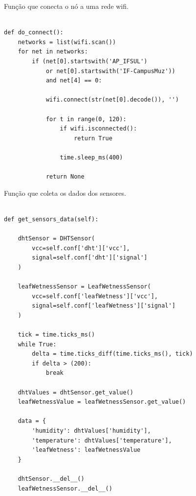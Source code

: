 \begin{quadro}[H]
\centering
\caption{Função que conecta o nó a uma rede wifi.}
\vspace{-\baselineskip}
\begin{verbatim}

def do_connect():
    networks = list(wifi.scan())
    for net in networks:
        if (net[0].startswith('AP_IFSUL') 
            or net[0].startswith('IF-CampusMuz')) 
            and net[4] == 0:
            
            wifi.connect(str(net[0].decode()), '')

            for t in range(0, 120):
                if wifi.isconnected():
                    return True

                time.sleep_ms(400)

            return None

\end{verbatim}
\vspace{-1.2cm}
\label{tab:funcao-conecta}
\end{quadro}

\begin{quadro}[H]
\centering
\caption{Função que coleta os dados dos sensores.}
\vspace{-\baselineskip}
\begin{verbatim}

def get_sensors_data(self):

    dhtSensor = DHTSensor(
        vcc=self.conf['dht']['vcc'], 
        signal=self.conf['dht']['signal']
    )
    
    leafWetnessSensor = LeafWetnessSensor(
        vcc=self.conf['leafWetness']['vcc'],
        signal=self.conf['leafWetness']['signal']
    )
        
    tick = time.ticks_ms()
    while True:
        delta = time.ticks_diff(time.ticks_ms(), tick)
        if delta > (200):
            break

    dhtValues = dhtSensor.get_value()
    leafWetnessValue = leafWetnessSensor.get_value()

    data = {
        'humidity': dhtValues['humidity'],
        'temperature': dhtValues['temperature'],
        'leafWetness': leafWetnessValue
    }

    dhtSensor.__del__()
    leafWetnessSensor.__del__()

\end{verbatim}
\vspace{-1.2cm}
\label{tab:funcao-coleta}
\end{quadro}

